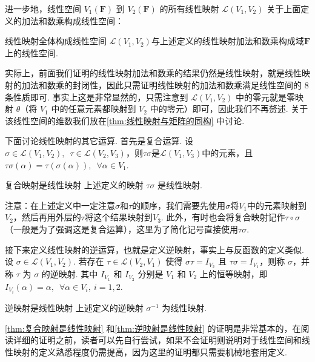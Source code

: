 进一步地，线性空间 $V_1(\mathbf{F})$ 到 $V_2(\mathbf{F})$ 的所有线性映射 $\mathcal{L}(V_1,V_2)$ 关于上面定义的加法和数乘构成线性空间：

\begin{theorem}{}{线性映射全体构成线性空间}
    $\mathcal{L}(V_1,V_2)$与上述定义的线性映射加法和数乘构成域$\mathbf{F}$上的线性空间.
\end{theorem}

实际上，前面我们证明的线性映射加法和数乘的结果仍然是线性映射，就是线性映射的加法和数乘的封闭性，因此只需证明线性映射的加法和数乘满足线性空间的 8 条性质即可. 事实上这是非常显然的，只需注意到 $\mathcal{L}(V_1,V_2)$ 中的零元就是零映射 $\theta$（将 $V_1$ 中的任意元素都映射到 $V_2$ 中的零元）即可，因此我们不再赘述. 关于该线性空间的维数我们放在\autoref{thm:线性映射与矩阵的同构} 中讨论.

下面讨论线性映射的其它运算. 首先是复合运算. 设$\sigma \in \mathcal{L}(V_1,V_2),\enspace\tau \in \mathcal{L}(V_2,V_3)$，则$\tau\sigma$是$\mathcal{L}(V_1,V_3)$中的元素，且$\tau\sigma(\alpha)=\tau(\sigma(\alpha)),\enspace\forall \alpha \in V_1$.

\begin{theorem}{}{复合映射是线性映射}
    上述定义的映射 $\tau\sigma$ 是线性映射.
\end{theorem}

注意：在上述定义中一定注意$\sigma$和$\tau$的顺序，我们需要先使用$\sigma$将$V_1$中的元素映射到$V_2$，然后再用外层的$\tau$将这个结果映射到$V_3$. 此外，有时也会将复合映射记作$\tau \circ \sigma$（一般是为了强调这是复合运算），这里为了简化记号直接使用$\tau\sigma$.

接下来定义线性映射的逆运算，也就是定义逆映射，事实上与反函数的定义类似. 设 $\sigma \in \mathcal{L}(V_1,V_2)$. 若存在 $\tau \in \mathcal{L}(V_2,V_1)$ 使得 $\sigma \tau = I_{V_2}$ 且 $\tau \sigma = I_{V_1}$，则称 $\sigma$，并称 $\tau$ 为 $\sigma$ 的逆映射. 其中 $I_{V_1}$ 和 $I_{V_2}$ 分别是 $V_1$ 和 $V_2$ 上的恒等映射，即 $I_{V_i}(\alpha)=\alpha,\enspace \forall \alpha \in V_i,\ i = 1, 2$.

\begin{theorem}{}{逆映射是线性映射}
    上述定义的逆映射 $\sigma^{-1}$ 为线性映射.
\end{theorem}

\autoref{thm:复合映射是线性映射} 和\autoref{thm:逆映射是线性映射} 的证明是非常基本的，在阅读详细的证明之前，读者可以先自行尝试，如果不会证明则说明对于线性空间和线性映射的定义熟悉程度仍需提高，因为这里的证明都只需要机械地套用定义.

